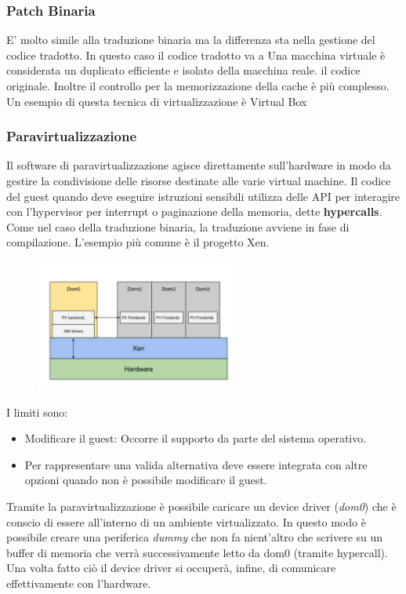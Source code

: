 \documentclass{article}
\begin{document}
		\subsubsection{Patch Binaria}
		E' molto simile alla traduzione binaria ma la differenza sta nella gestione del codice tradotto.
		In questo caso il codice tradotto va a Una macchina virtuale è considerata un duplicato efficiente e isolato della macchina reale. il codice originale. Inoltre il controllo per la memorizzazione della cache è più complesso.
		Un esempio di questa tecnica di virtualizzazione è Virtual Box
		
		\subsubsection{Paravirtualizzazione}
		Il software di paravirtualizzazione agisce direttamente sull'hardware in modo da gestire la condivisione delle risorse destinate alle varie virtual machine.
		Il codice del guest quando deve eseguire istruzioni sensibili utilizza delle API per interagire con l'hypervisor per interrupt o paginazione della memoria, dette \textbf{hypercalls}.
		Come nel caso della traduzione binaria, la traduzione avviene in fase di compilazione.
		L'esempio più comune è il progetto Xen.\\ 
		
		\begin{figure}[ht]
			\centering
			\includegraphics[width=0.6\textwidth]{SAC_B1_virtualizationIO_Par.png} %
		\end{figure}
		
		I limiti sono:
		\begin{itemize}
		    \item Modificare il guest: Occorre il supporto da parte del sistema operativo.
		    \item Per rappresentare una valida alternativa deve essere integrata con altre opzioni quando non è possibile modificare il guest.
		\end{itemize}
		Tramite la paravirtualizzazione è possibile caricare un device driver (\emph{dom0}) che è conscio di
		essere all’interno di un ambiente virtualizzato. In questo modo è possibile creare una
		periferica \textit{dummy} che non fa nient’altro che scrivere su un buffer di memoria che verrà successivamente
		letto da dom0 (tramite hypercall). Una volta fatto ciò il device driver si occuperà, infine, di comunicare effettivamente con l'hardware.\\ 
		
\end{document}
